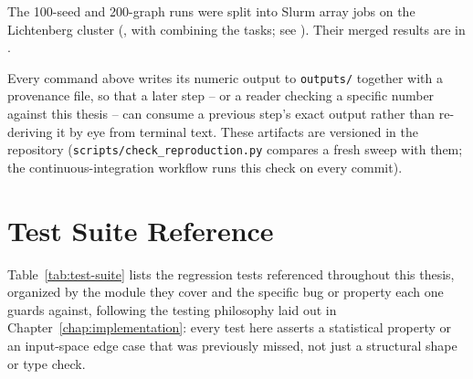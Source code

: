 \documentclass[
  english,
  class=report,
  accentcolor=2c,
  marginpar=false,
  parskip=half-,
  fontsize=11pt,
  ruledheaders=false,
  pdfa=false,
  IMRAD=false,
  thesis={type=master}
]{tudapub}
\begin{document}
\noindent The 100-seed and 200-graph runs were split into Slurm array jobs
on the Lichtenberg cluster (, with
 combining the tasks; see
). Their merged results are in
.

Every command above writes its numeric output to \texttt{outputs/} together with
a provenance file, so that a later step -- or a reader checking a specific
number against this thesis -- can consume a previous step's exact output
rather than re-deriving it by eye from terminal text. These artifacts are
versioned in the repository (\texttt{scripts/check\_reproduction.py}
compares a fresh sweep with them; the continuous-integration workflow runs
this check on every commit).

\section{Test Suite Reference}
Table~\ref{tab:test-suite} lists the regression tests referenced throughout
this thesis, organized by the module they cover and the specific bug or
property each one guards against, following the testing philosophy laid
out in Chapter~\ref{chap:implementation}: every test here asserts a
statistical property or an input-space edge case that was previously
missed, not just a structural shape or type check.
\end{document}
